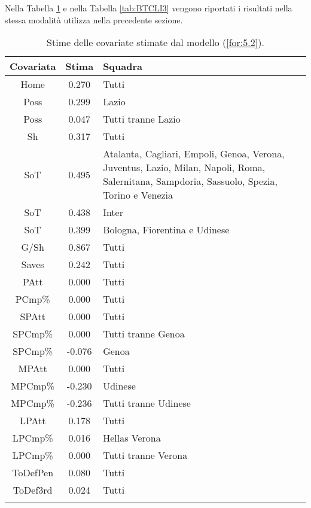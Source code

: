 Nella Tabella \ref{tab:BTCLI2} e nella Tabella \ref{tab:BTCLI3} vengono riportati i risultati nella stessa modalità utilizza nella precedente sezione.
\begin{table}[]%
	
	\renewcommand{\arraystretch}{1.7}
	\centering
	\begin{tabular}{ccp{10cm}}
		\hline	
		
		\textbf{Covariata} & \textbf{Stima} & \textbf{Squadra} \\	
		\hline
		Home & 0.270 & Tutti\\
		Poss & 0.299 & Lazio \\
		Poss & 0.047 & Tutti tranne Lazio\\
		Sh & 0.317 & Tutti \\
		SoT & 0.495 & Atalanta, Cagliari, Empoli, Genoa, Verona, Juventus, Lazio, Milan, Napoli, Roma, Salernitana, Sampdoria, Sassuolo, Spezia, Torino e Venezia\\
		SoT & 0.438 & Inter\\
		SoT & 0.399 & Bologna, Fiorentina e Udinese \\
		G/Sh & 0.867 & Tutti \\
		Saves & 0.242 & Tutti \\
		PAtt & 0.000 & Tutti \\
		PCmp\% & 0.000 & Tutti \\
		SPAtt & 0.000 & Tutti \\
		SPCmp\% & 0.000 & Tutti tranne Genoa \\ 
		SPCmp\% & -0.076 & Genoa \\	
		MPAtt & 0.000 & Tutti \\ 
		MPCmp\% & -0.230 & Udinese \\
		MPCmp\% & -0.236 & Tutti tranne Udinese \\		
		LPAtt & 0.178 & Tutti \\
		LPCmp\% & 0.016 & Hellas Verona \\
		LPCmp\% & 0.000 & Tutti tranne Verona \\
		ToDefPen & 0.080 & Tutti \\      
		ToDef3rd & 0.024 & Tutti \\
		
		
		\hline
		& &  \\
		
	\end{tabular} \hbox{}
	\caption{Stime delle covariate stimate dal modello (\ref{for:5.2}).} \label{tab:BTCLI2} 
	
\end{table}

